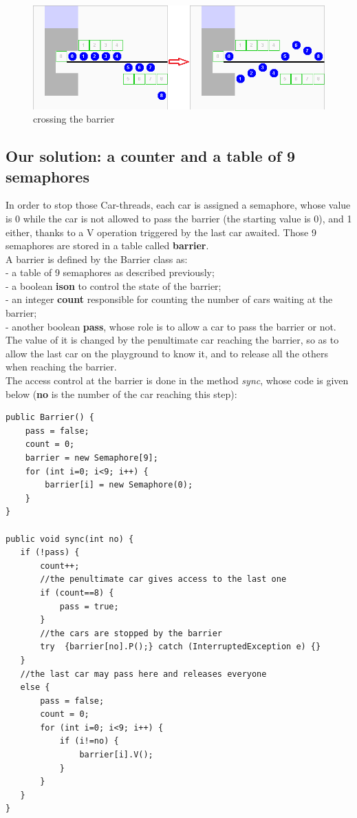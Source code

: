 \documentclass[a4paper,12pt,twoside]{article}
\begin{document}
\begin{figure}[h]
   \caption{\label{Barrier} crossing the barrier}
   \includegraphics[width=14cm]{screens/Barrier}
\end{figure}

\subsection{Our solution: a counter and a table of 9 semaphores}
In order to stop those Car-threads, each car is assigned a semaphore, whose value is 0 while the car is not allowed to pass the barrier (the starting value is 0), and 1 either, thanks to a V operation triggered by the last car awaited. Those 9 semaphores are stored in a table called \textbf{barrier}.\\

\noindent A barrier is defined by the Barrier class as:\\
 - a table of 9 semaphores as described previously;\\
 - a boolean \textbf{ison} to control the state of the barrier;\\
 - an integer \textbf{count} responsible for counting the number of cars waiting at the barrier;\\
 - another boolean \textbf{pass}, whose role is to allow a car to pass the barrier or not. The value of it is changed by the penultimate car reaching the barrier, so as to allow the last car on the playground to know it, and to release all the others when reaching the barrier.\\

The access control at the barrier is done in the method \textit{sync}, whose code is given below (\textbf{no} is the number of the car reaching this step):
\begin{verbatim}
public Barrier() {
	pass = false;
	count = 0;
	barrier = new Semaphore[9];
	for (int i=0; i<9; i++) {
		barrier[i] = new Semaphore(0);
	}
}
		
public void sync(int no) {
   if (!pass) {
	   count++;
	   //the penultimate car gives access to the last one
	   if (count==8) {
		   pass = true;
	   }
	   //the cars are stopped by the barrier
	   try  {barrier[no].P();} catch (InterruptedException e) {}
   }
   //the last car may pass here and releases everyone
   else {
	   pass = false;
	   count = 0;
	   for (int i=0; i<9; i++) {
		   if (i!=no) {
			   barrier[i].V();
		   }
	   }
   }
}
\end{verbatim}
\end{document}
